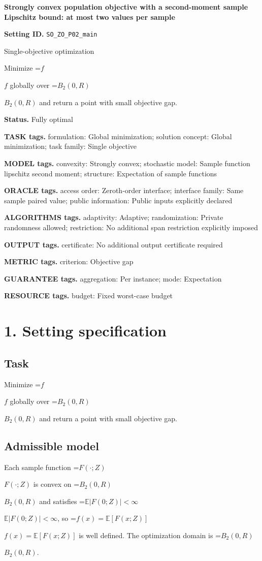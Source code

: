 \documentclass[10pt,a4paper]{article}
\newcommand{\AtlasMath}[1]{\par\begingroup\centering\setbox0=\hbox{$\displaystyle #1$}\ifdim\wd0>1.4\linewidth\typeout{ATLAS WIDE FORMULA: \the\wd0}\fi\ifdim\wd0>\linewidth\resizebox{\linewidth}{!}{\box0}\else\box0\fi\par\endgroup}
\newcommand{\AtlasInlineMath}[1]{\begingroup\setbox0=\hbox{$#1$}\ifdim\wd0>.4\linewidth\endgroup\AtlasMath{#1}\else\endgroup$#1$\fi}
\begin{document}
\raggedright

{\LARGE\bfseries\sffamily\color{AtlasNavy} Strongly convex population objective with a second-moment sample Lipschitz bound: at most two values per sample\par}\vspace{5pt}
\textbf{Setting ID.} \texttt{SO\_\allowbreak{}ZO\_\allowbreak{}P02\_\allowbreak{}main}

Single-objective optimization

Minimize \AtlasInlineMath{f} globally over \AtlasInlineMath{B_2(0,R)} and return a point with small objective gap.

\textbf{Status.} Fully optimal

\textbf{TASK tags.} formulation: Global minimization; solution concept: Global minimization; task family: Single objective

\textbf{MODEL tags.} convexity: Strongly convex; stochastic model: Sample function lipschitz second moment; structure: Expectation of sample functions

\textbf{ORACLE tags.} access order: Zeroth-order interface; interface family: Same sample paired value; public information: Public inputs explicitly declared

\textbf{ALGORITHMS tags.} adaptivity: Adaptive; randomization: Private randomness allowed; restriction: No additional span restriction explicitly imposed

\textbf{OUTPUT tags.} certificate: No additional output certificate required

\textbf{METRIC tags.} criterion: Objective gap

\textbf{GUARANTEE tags.} aggregation: Per instance; mode: Expectation

\textbf{RESOURCE tags.} budget: Fixed worst-case budget

\section{1. Setting specification}
\subsection{Task}
Minimize \AtlasInlineMath{f} globally over \AtlasInlineMath{B_2(0,R)} and return a point with small objective gap.

\subsection{Admissible model}
Each sample function \AtlasInlineMath{F(\cdot;Z)} is convex on \AtlasInlineMath{B_2(0,R)} and satisfies \AtlasInlineMath{\mathbb{E}|F(0;Z)|<\infty}, so \AtlasInlineMath{f(x)=\mathbb{E}[F(x;Z)]} is well defined. The optimization domain is \AtlasInlineMath{B_2(0,R)}.
\end{document}
